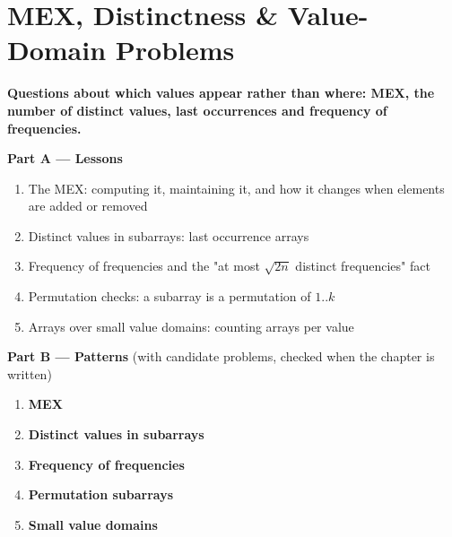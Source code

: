 \chapter{MEX, Distinctness \& Value-Domain Problems}
\label{ch:value_domain}

\begin{tcolorbox}[enhanced, colback=white, colframe=secondaryblue, boxrule=1pt, arc=2mm]
\textbf{\large\textcolor{primaryblue}{Questions about which values appear rather than where: MEX, the number of distinct values, last occurrences and frequency of frequencies.}}
\end{tcolorbox}


\begin{plannedbox}
\textbf{Part A --- Lessons}
\begin{enumerate}[leftmargin=*, label=\textbf{A\arabic*.}, itemsep=1pt]
    \item The MEX: computing it, maintaining it, and how it changes when elements are added or removed
    \item Distinct values in subarrays: last occurrence arrays
    \item Frequency of frequencies and the "at most $\sqrt{2n}$ distinct frequencies" fact
    \item Permutation checks: a subarray is a permutation of $1..k$
    \item Arrays over small value domains: counting arrays per value
\end{enumerate}
\textbf{Part B --- Patterns} (with candidate problems, checked when the chapter is written)
\begin{enumerate}[leftmargin=*, label=\textbf{P\arabic*.}, itemsep=1pt]
    \item \textbf{MEX}
    \item \textbf{Distinct values in subarrays}
    \item \textbf{Frequency of frequencies}
    \item \textbf{Permutation subarrays}
    \item \textbf{Small value domains}
\end{enumerate}
\end{plannedbox}
